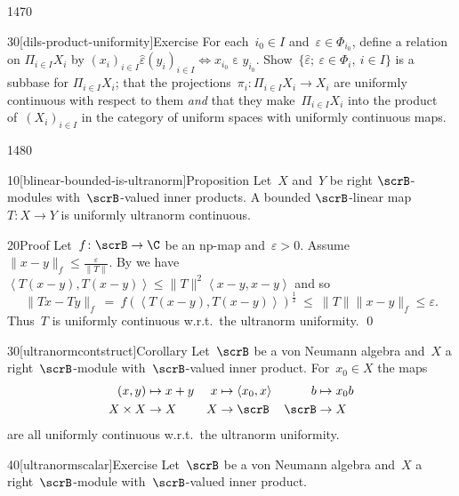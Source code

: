 \begin{parsec}{1470}
\begin{point}{30}[dils-product-uniformity]{Exercise}
    For each~$i_0 \in I$
    and~$\varepsilon \in \Phi_{i_0}$,
    define a relation on
    $\Pi_{i \in I} X_i$ by
    $(x_i)_{i \in I} \mathrel{\hat\varepsilon} (y_i)_{i \in I}
    \iff x_{i_0} \mathrel\varepsilon y_{i_0}$.
    Show~$\{ \hat\varepsilon;\ \varepsilon \in \Phi_i, \ i\in I \}$
    is a subbase for $\Pi_{i \in I} X_i$;
    that the projections~$\pi_i \colon \Pi_{i \in I} X_i \to X_i$
    are uniformly continuous with respect to them
    \emph{and} that they make~$\Pi_{i \in I} X_i$
    into the product of~$(X_i)_{i \in I}$
    in the category of uniform spaces with uniformly continuous maps.
\end{point}
\end{parsec}

\begin{parsec}{1480}%
\begin{point}{10}[blinear-bounded-is-ultranorm]{Proposition}%
Let~$X$ and~$Y$ be right $\scrB$-modules
    with~$\scrB$-valued inner products.
A bounded $\scrB$-linear map~$T\colon X \to Y$
    is uniformly ultranorm continuous.
\begin{point}{20}{Proof}%
Let~$f\colon \scrB \to \C$ be an np-map
    and~$\varepsilon > 0$.
Assume~$\|x-y\|_f \leq \frac{\varepsilon}{\|T\|}$.
By 
we have~$\left<T(x-y), T(x-y)\right> \leq \|T\|^2\left<x-y,x-y\right>$
and so
\begin{equation*}
    \|Tx - Ty\|_f \  =\  f(\left<T(x-y),T(x-y)\right>)^{\frac{1}{2}}
\ \leq\  \|T\| \|x-y\|_f \leq \varepsilon.
\end{equation*}
Thus~$T$ is uniformly continuous w.r.t.~the ultranorm uniformity. \qed
\end{point}
\end{point}
\begin{point}{30}[ultranormcontstruct]{Corollary}%
Let~$\scrB$ be a von Neumann algebra
    and~$X$ a right~$\scrB$-module
    with~$\scrB$-valued inner product.
For~$x_0 \in X$ the maps
\begin{align*}
    (x,y) &\mapsto x+y & x &\mapsto \left<x_0, x\right>
    & b &\mapsto x_0 b \\
    X\times X &\to X & X &\to \scrB & \scrB & \to X
\end{align*}
are all uniformly continuous w.r.t.~the ultranorm uniformity.
\end{point}
\begin{point}{40}[ultranormscalar]{Exercise}%
Let~$\scrB$ be a von Neumann algebra and~$X$ a right~$\scrB$-module
    with~$\scrB$-valued inner product.

\end{point}
\end{parsec}
